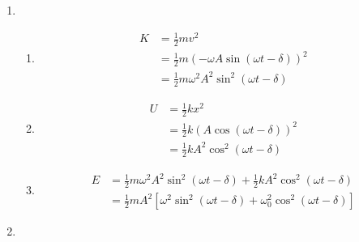 \documentclass{article}
\begin{document}
\begin{enumerate}
  \item

        \begin{enumerate}
          \item

                \begin{align*}
                  K & = \frac{1}{2} m v^2                                                 \\
                    & = \frac{1}{2} m \left( -\omega A \sin (\omega t - \delta) \right)^2 \\
                    & = \frac{1}{2} m \omega^2 A^2 \sin^2 (\omega t - \delta)
                \end{align*}

          \item

                \begin{align*}
                  U & = \frac{1}{2} k x^2                            \\
                    & = \frac{1}{2} k (A \cos (\omega t - \delta))^2 \\
                    & = \frac{1}{2} k A^2 \cos^2 (\omega t - \delta)
                \end{align*}

          \item

                \begin{align*}
                  E & = \frac{1}{2} m \omega^2 A^2 \sin^2 (\omega t - \delta) + \frac{1}{2} k A^2 \cos^2 (\omega t - \delta) \\
                    & = \frac{1}{2} m A^2 [\omega^2 \sin^2 (\omega t - \delta) + \omega_0^2 \cos^2 (\omega t - \delta)]
                \end{align*}
        \end{enumerate}

  \item


\end{enumerate}
\end{document}
